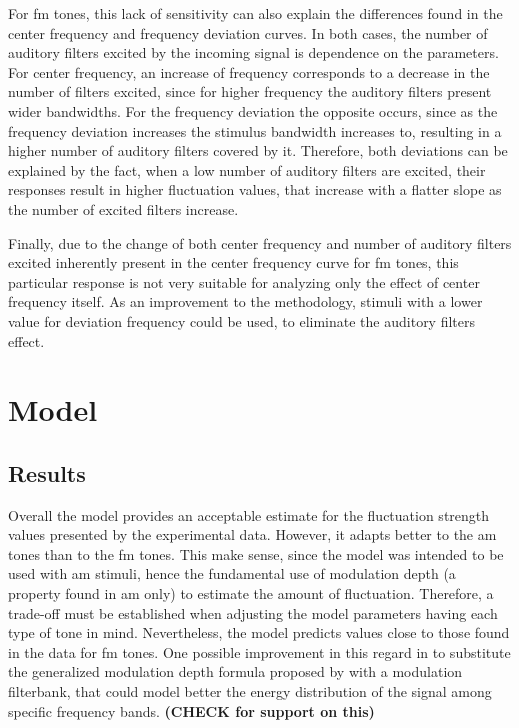 \documentclass[../main.tex]{subfiles}
\begin{document}
For \gls{fm} tones, this lack of sensitivity can also explain the differences
found in the center frequency and frequency deviation curves. In both cases,
the number of auditory filters excited by the incoming signal is dependence on
the parameters. For center frequency, an increase of frequency corresponds to a
decrease in the number of filters excited, since for higher frequency the
auditory filters present wider bandwidths. For the frequency deviation the
opposite occurs, since as the frequency deviation increases the stimulus
bandwidth increases to, resulting in a higher number of auditory filters covered
by it. Therefore, both deviations can be explained by the fact, when a low
number of auditory filters are excited, their responses result in higher
fluctuation values, that increase with a flatter slope as the number of excited
filters increase.

Finally, due to the change of both center frequency and number of auditory
filters excited inherently present in the center frequency curve for \gls{fm}
tones, this particular response is not very suitable for analyzing only the
effect of center frequency itself. As an improvement to the methodology,
stimuli with a lower value for deviation frequency could be used, to eliminate
the auditory filters effect.

\section{Model}

\subsection{Results}

Overall the model provides an acceptable estimate for the fluctuation strength
values presented by the experimental data. However, it adapts better to the
\gls{am} tones than to the \gls{fm} tones. This make sense, since the model
was intended to be used with \gls{am} stimuli, hence the fundamental use of
modulation depth (a property found in \gls{am} only) to estimate the amount of
fluctuation. Therefore, a trade-off must be established when adjusting the model
parameters having each type of tone in mind. Nevertheless, the model predicts
values close to those found in the data for \gls{fm} tones. One possible
improvement in this regard in to substitute the generalized modulation depth
formula proposed by \citeauthor{daniel1997psychoacoustical} with a modulation
filterbank, that could model better the energy distribution of the signal
among specific frequency bands. {\bfseries \color{red} (CHECK \cite{Dau1997} for
support on this)}
\end{document}
